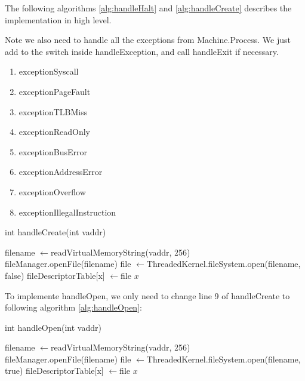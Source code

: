 \documentclass{article}
\renewcommand{\gets}{%
  \ensuremath{\leftarrow}}
\begin{document}
\begin{spacing}{1.1}
The following algorithms \ref{alg:handleHalt} and \ref{alg:handleCreate} describes the implementation in high level.

Note we also need to handle all the exceptions from \textsf{Machine.Process}. We just add to the switch inside \textsf{handleException}, and call \textsf{handleExit} if necessary.
\begin{enumerate}[$\bullet$]
\item \textsf{exceptionSyscall}
\item \textsf{exceptionPageFault}
\item \textsf{exceptionTLBMiss}
\item \textsf{exceptionReadOnly}
\item \textsf{exceptionBusError}
\item \textsf{exceptionAddressError}
\item \textsf{exceptionOverflow}
\item \textsf{exceptionIllegalInstruction}
\end{enumerate}

\begin{algorithm}
\end{algorithm}

\begin{algorithm}[H]
  \label{alg:handleCreate}
  \caption{int \textsf{handleCreate}(int vaddr)}
   {
    \;
  }
   filename \gets \textsf{readVirtualMemoryString}(vaddr, 256)\;
   {
    \;
  }
   {
     fileManager.openFile(filename)\;
     file \gets \textsf{ThreadedKernel.fileSystem.open}(filename, false)\;
     fileDescriptorTable[x] \gets file\;
     \Return $x$
   }{
    \;
  }
\end{algorithm}

To implemente \textsf{handleOpen}, we only need to change line 9 of \textsf{handleCreate} to following algorithm \ref{alg:handleOpen}:
\begin{algorithm}[H]
  \label{alg:handleOpen}
  \caption{int \textsf{handleOpen}(int vaddr)}
  {
    \;
  }
   filename \gets \textsf{readVirtualMemoryString}(vaddr, 256)\;
   {
    \;
  }
   {
     fileManager.openFile(filename)\;
     \colorbox{myyellow}{file \gets \textsf{ThreadedKernel.fileSystem.open}(filename, true)}\;
     fileDescriptorTable[x] \gets file\;
    \Return $x$\;
  }{
    \;
  }
\end{algorithm}


\end{spacing}
\end{document}

